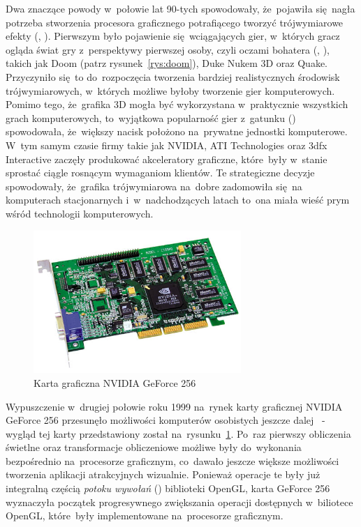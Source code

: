 Dwa znaczące powody w~połowie lat 90-tych spowodowały, że~pojawiła się~nagła potrzeba stworzenia procesora graficznego potrafiącego tworzyć trójwymiarowe efekty (, ). Pierwszym było pojawienie się~wciągających gier, w~których gracz ogląda świat gry z~perspektywy pierwszej osoby, czyli oczami bohatera (, ), takich jak Doom (patrz rysunek~\ref{rys:doom}), Duke Nukem 3D oraz Quake. Przyczyniło się~to do~rozpoczęcia tworzenia bardziej realistycznych środowisk trójwymiarowych, w~których możliwe byłoby tworzenie gier komputerowych. Pomimo tego, że~grafika 3D mogła być wykorzystana w~praktycznie wszystkich grach komputerowych, to~wyjątkowa popularność gier z~gatunku  () spowodowała, że~większy nacisk położono na~prywatne jednostki komputerowe. W~tym samym czasie firmy takie jak NVIDIA, ATI Technologies oraz 3dfx Interactive zaczęły produkować akceleratory graficzne, które~były w~stanie sprostać ciągle rosnącym wymaganiom klientów. Te strategiczne decyzje spowodowały, że~grafika trójwymiarowa na~dobre zadomowiła się~na komputerach stacjonarnych i~w~nadchodzących latach to~ona miała wieść prym wśród technologii komputerowych.

\begin{figure}[ht]
\centering\includegraphics[width=0.7\textwidth]{figures/03/geforce-256.jpg}
\caption{Karta graficzna NVIDIA GeForce 256}\label{rys:gf256}
\end{figure}

Wypuszczenie w~drugiej połowie roku 1999 na~rynek karty graficznej NVIDIA GeForce 256 przesunęło możliwości komputerów osobistych jeszcze dalej~\cite{nvidia:geforce256} - wygląd tej karty przedstawiony został na~rysunku~\ref{rys:gf256}. Po~raz pierwszy obliczenia świetlne oraz transformacje obliczeniowe możliwe były do~wykonania bezpośrednio na~procesorze graficznym, co~dawało jeszcze większe możliwości tworzenia aplikacji atrakcyjnych wizualnie. Ponieważ operacje te były już integralną częścią \emph{potoku wywołań} () biblioteki OpenGL, karta GeForce 256 wyznaczyła początek progresywnego zwiększania operacji dostępnych w~biliotece OpenGL, które~były implementowane na~procesorze graficznym.

